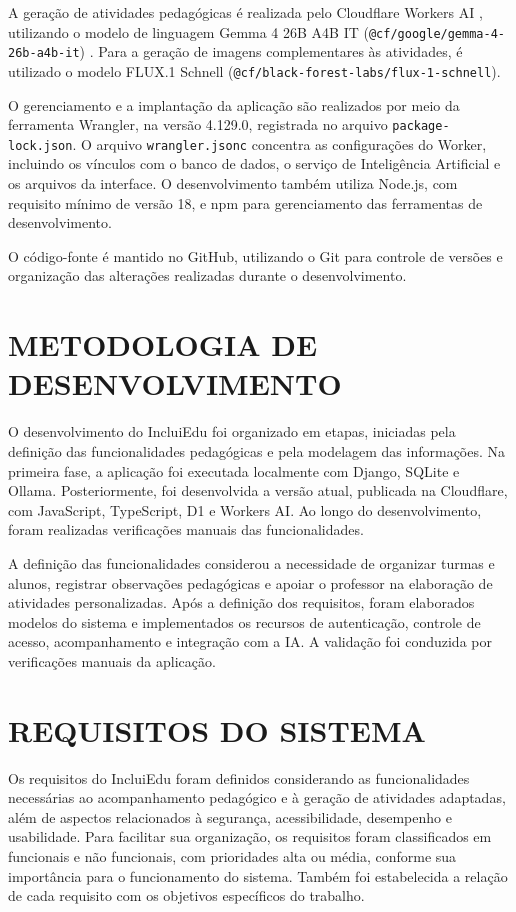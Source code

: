 A geração de atividades pedagógicas é realizada pelo Cloudflare Workers AI \cite{cloudflare2026workersai}, utilizando o modelo de linguagem Gemma 4 26B A4B IT (\texttt{@cf/google/gemma-4-26b-a4b-it}) \cite{cloudflare2026gemma}. Para a geração de imagens complementares às atividades, é utilizado o modelo FLUX.1 Schnell (\texttt{@cf/black-forest-labs/flux-1-schnell}).

O gerenciamento e a implantação da aplicação são realizados por meio da ferramenta Wrangler, na versão 4.129.0, registrada no arquivo \texttt{package-lock.json}. O arquivo \texttt{wrangler.jsonc} concentra as configurações do Worker, incluindo os vínculos com o banco de dados, o serviço de Inteligência Artificial e os arquivos da interface. O desenvolvimento também utiliza Node.js, com requisito mínimo de versão 18, e npm para gerenciamento das ferramentas de desenvolvimento.

O código-fonte é mantido no GitHub, utilizando o Git para controle de versões e organização das alterações realizadas durante o desenvolvimento.

\section{METODOLOGIA DE DESENVOLVIMENTO}

O desenvolvimento do IncluiEdu foi organizado em etapas, iniciadas pela definição das funcionalidades pedagógicas e pela modelagem das informações. Na primeira fase, a aplicação foi executada localmente com Django, SQLite e Ollama. Posteriormente, foi desenvolvida a versão atual, publicada na Cloudflare, com JavaScript, TypeScript, D1 e Workers AI. Ao longo do desenvolvimento, foram realizadas verificações manuais das funcionalidades.

A definição das funcionalidades considerou a necessidade de organizar turmas e alunos, registrar observações pedagógicas e apoiar o professor na elaboração de atividades personalizadas. Após a definição dos requisitos, foram elaborados modelos do sistema e implementados os recursos de autenticação, controle de acesso, acompanhamento e integração com a IA. A validação foi conduzida por verificações manuais da aplicação.

\section{REQUISITOS DO SISTEMA}

Os requisitos do IncluiEdu foram definidos considerando as funcionalidades necessárias ao acompanhamento pedagógico e à geração de atividades adaptadas, além de aspectos relacionados à segurança, acessibilidade, desempenho e usabilidade. Para facilitar sua organização, os requisitos foram classificados em funcionais e não funcionais, com prioridades alta ou média, conforme sua importância para o funcionamento do sistema. Também foi estabelecida a relação de cada requisito com os objetivos específicos do trabalho.

